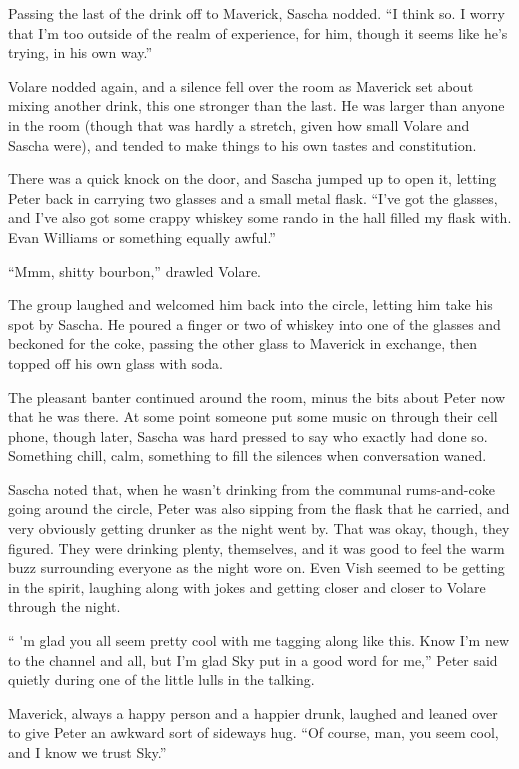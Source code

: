 \documentclass[12pt,letterpaper,oneside]{memoir}
\begin{document}
  Passing the last of the drink off to Maverick, Sascha nodded. ``I think so. I worry that I'm too outside of the realm of experience, for him, though it seems like he's trying, in his own way.''

  Volare nodded again, and a silence fell over the room as Maverick set about mixing another drink, this one stronger than the last. He was larger than anyone in the room (though that was hardly a stretch, given how small Volare and Sascha were), and tended to make things to his own tastes and constitution.

  There was a quick knock on the door, and Sascha jumped up to open it, letting Peter back in carrying two glasses and a small metal flask. ``I've got the glasses, and I've also got some crappy whiskey some rando in the hall filled my flask with. Evan Williams or something equally awful.''

  ``Mmm, shitty bourbon,'' drawled Volare.

  The group laughed and welcomed him back into the circle, letting him take his spot by Sascha. He poured a finger or two of whiskey into one of the glasses and beckoned for the coke, passing the other glass to Maverick in exchange, then topped off his own glass with soda.

  The pleasant banter continued around the room, minus the bits about Peter now that he was there. At some point someone put some music on through their cell phone, though later, Sascha was hard pressed to say who exactly had done so. Something chill, calm, something to fill the silences when conversation waned.

  Sascha noted that, when he wasn't drinking from the communal rums-and-coke going around the circle, Peter was also sipping from the flask that he carried, and very obviously getting drunker as the night went by. That was okay, though, they figured. They were drinking plenty, themselves, and it was good to feel the warm buzz surrounding everyone as the night wore on. Even Vish seemed to be getting in the spirit, laughing along with jokes and getting closer and closer to Volare through the night.

  `` \'{}m glad you all seem pretty cool with me tagging along like this. Know I'm new to the channel and all, but I'm glad Sky put in a good word for me,'' Peter said quietly during one of the little lulls in the talking.

  Maverick, always a happy person and a happier drunk, laughed and leaned over to give Peter an awkward sort of sideways hug. ``Of course, man, you seem cool, and I know we trust Sky.''
\end{document}
